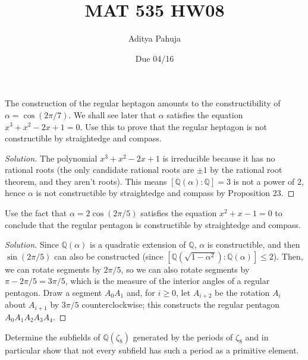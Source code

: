 \documentclass[10pt]{article}
\title{MAT 535 HW08}
\author{\large Aditya Pahuja}
\date{\large Due 04/16}
\providecommand{\QQ}{\mathbb Q}
\newenvironment{soln}{\begin{proof}[Solution]}{\end{proof}}
\begin{document}
\maketitle

\begin{problem}
    [\S13.3\#4]
    The construction of the regular heptagon amounts to
    the constructibility of $\alpha = \cos(2\pi/7)$.
    We shall see later that $\alpha$ satisfies
    the equation $x^3 + x^2 - 2x + 1 = 0$.
    Use this to prove that the regular heptagon is not constructible
    by straightedge and compass.
\end{problem}

\begin{soln}
    The polynomial $x^3 + x^2 - 2x + 1$ is irreducible
    because it has no rational roots
    (the only candidate rational roots are $\pm 1$
    by the rational root theorem, and they aren't roots).
    This means $[\QQ(\alpha) : \QQ] = 3$ is not a power of $2$,
    hence $\alpha$ is not constructible by straightedge and compass
    by Proposition 23.
\end{soln}

\begin{problem}
    [\S13.3\#5]
    Use the fact that $\alpha = 2\cos(2\pi/5)$
    satisfies the equation $x^2 + x - 1 = 0$ to conclude that
    the regular pentagon is constructible by straightedge and compass.
\end{problem}

\begin{soln}
    Since $\QQ(\alpha)$ is a quadratic extension of $\QQ$,
    $\alpha$ is constructible, and then $\sin(2\pi/5)$
    can also be constructed (since
    $[\QQ(\sqrt{1-\alpha^2}):\QQ(\alpha)]\le 2$).
    Then, we can rotate segments by $2\pi/5$,
    so we can also rotate segments by $\pi - 2\pi/5 = 3\pi/5$,
    which is the measure of the interior angles of a regular pentagon.
    Draw a segment $A_0A_1$ and, for $i\ge 0$, let $A_{i+2}$
    be the rotation $A_i$ about $A_{i+1}$ by $3\pi/5$ counterclockwise;
    this constructs the regular pentagon $A_0A_1A_2A_3A_4$.
\end{soln}

\begin{problem}
    [\S14.5\#2]
    Determine the subfields of $\QQ(\zeta_8)$ generated by
    the periods of $\zeta_8$ and in particular show that
    not every subfield has such a period as a primitive element.
\end{problem}
\end{document}
